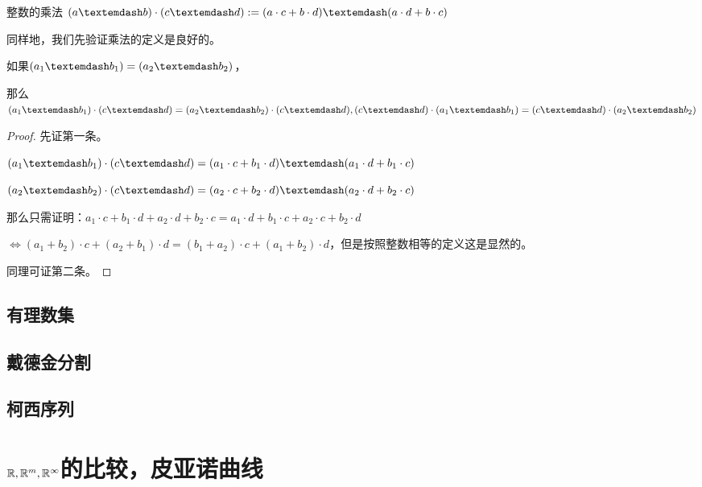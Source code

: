 \documentclass[12pt, a4paper, oneside, UTF8]{ctexbook}
\begin{document}
\begin{para}{0}
\begin{defn}{整数的乘法}{}
						$(a\textemdash b)\cdot(c\textemdash d) := (a\cdot c + b\cdot d)\textemdash(a\cdot d+b\cdot c)$
					\end{defn}
					同样地，我们先验证乘法的定义是良好的。
					\begin{proposition}
						如果$(a_1 \textemdash b_1)=(a_2 \textemdash b_2)$，
						
						那么$(a_1 \textemdash b_1)\cdot (c\textemdash d)=(a_2 \textemdash b_2)\cdot (c\textemdash d),(c\textemdash d)\cdot (a_1 \textemdash b_1)=(c\textemdash d)\cdot(a_2 \textemdash b_2)$
					\end{proposition}
					\begin{proof}
						先证第一条。
						
						$(a_1 \textemdash b_1)\cdot (c\textemdash d)=(a_1 \cdot c+b_1\cdot d)\textemdash (a_1\cdot d+b_1\cdot c)$
						
						$(a_2 \textemdash b_2)\cdot (c\textemdash d)=(a_2\cdot c+b_2\cdot d)\textemdash (a_2\cdot d+b_2\cdot c)$
						
						那么只需证明：$a_1 \cdot c+b_1\cdot d+a_2\cdot d+b_2\cdot c=a_1\cdot d+b_1\cdot c+a_2\cdot c+b_2\cdot d$
						
						$\Leftrightarrow (a_1+b_2)\cdot c + (a_2+b_1)\cdot d = (b_1+a_2)\cdot c+(a_1+b_2)\cdot d$，但是按照整数相等的定义这是显然的。
						
						同理可证第二条。
					\end{proof}
			\end{para}
		\subsection{有理数集}
		\subsection{戴德金分割}
		\subsection{柯西序列}
	\section{\texorpdfstring{$\mathbb{R},\mathbb{R}^m,\mathbb{R}^\infty$}势的比较，皮亚诺曲线}
\end{document}
